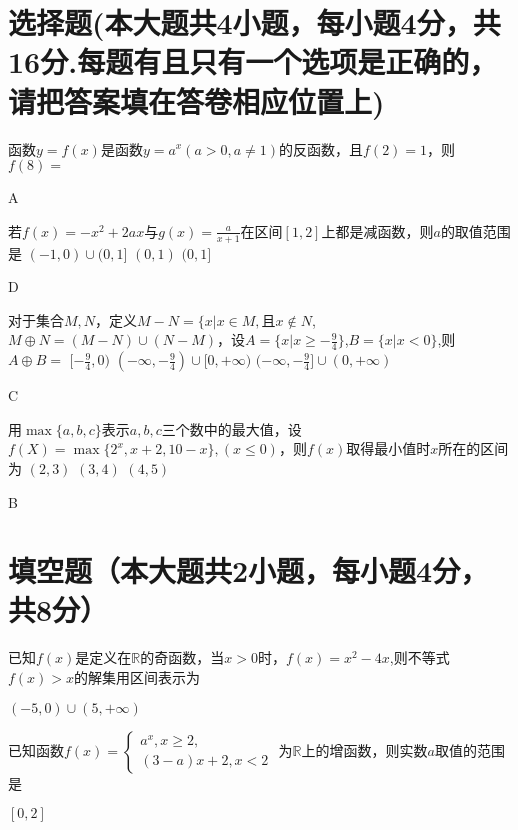 \begin{exercise}
\section{选择题(本大题共4小题，每小题4分，共16分.每题有且只有一个选项是正确的，请把答案填在答卷相应位置上)}
  \item
    函数$y=f(x)$是函数$y=a^x(a>0,a\neq1)$的反函数，且$f(2)=1$，则$f(8)=$\xz
    \begin{answer}
      A
    \end{answer}
  \item
    若$f(x)=-x^2+2ax$与$g(x)=\frac{a}{x+1}$在区间$[1,2]$上都是减函数，则$a$的取值范围是\xz
      {$(-1,0)\cup (0,1]$}
      {$(0,1)$}
      {$(0,1]$}
    \begin{answer}
      D
    \end{answer}
  \item
    对于集合$M,N$，定义$M-N=\{x|x\in M,\text{且}x\notin N$,$M\oplus N=(M-N)\cup(N-M)$，设$A=\{x|x\geq-\frac{9}4\}$,$B=\{x|x<0\}$,则$A\oplus B=$\xz
      \xx{$(-\frac{9}4,0]$}
      {$[-\frac{9}4,0)$}
      {$(-\infty,-\frac{9}4)\cup[0,+\infty)$}
      {$(-\infty,-\frac{9}4]\cup(0,+\infty)$}
    \begin{answer}
      C
    \end{answer}
  \item
    用$\max\{a,b,c\}$表示$a,b,c$三个数中的最大值，设$f(X)=\max\{2^x,x+2,10-x\},(x\leq 0)$，则$f(x)$取得最小值时$x$所在的区间为\xz
      {$(2,3)$}
      {$(3,4)$}
      {$(4,5)$}
    \begin{answer}
      B
    \end{answer}
\section{填空题（本大题共2小题，每小题4分，共8分）}
  \item
    已知$f(x)$是定义在$\mathbb{R}$的奇函数，当$x>0$时，$f(x)=x^2-4x$,则不等式$f(x)>x$的解集用区间表示为\tk
    \begin{answer}
      $(-5,0)\cup(5,+\infty)$
    \end{answer}
  \item
    已知函数$f(x)=\begin{cases}
      a^x,x\geq 2,\\(3-a)x+2,x<2
    \end{cases}$
    为$\mathbb{R}$上的增函数，则实数$a$取值的范围是\tk
    \begin{answer}
      $[0,2]$
    \end{answer}

\end{exercise}
